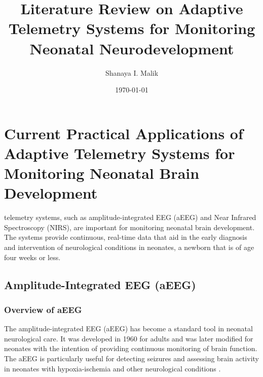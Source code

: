 \documentclass[12pt,journal,compsoc]{IEEEtran}
\begin{document}
\title{Literature Review on Adaptive Telemetry Systems for Monitoring Neonatal Neurodevelopment}
\author{Shanaya I. Malik}

\date{\today}

%


\maketitle

\section{Current Practical Applications of Adaptive Telemetry Systems for Monitoring Neonatal Brain Development}

 telemetry systems, such as amplitude-integrated EEG (aEEG) and Near Infrared Spectroscopy (NIRS), are important for monitoring neonatal brain development. The systems provide continuous, real-time data that aid in the early diagnosis and intervention of neurological conditions in neonates, a newborn that is of age four weeks or less. 

\subsection{Amplitude-Integrated EEG (aEEG)}

\subsubsection{Overview of aEEG}
The amplitude-integrated EEG (aEEG) has become a standard tool in neonatal neurological care. It was developed in 1960 for adults and was later modified for neonates with the intention of providing continuous monitoring of brain function. The aEEG is particularly useful for detecting seizures and assessing brain activity in neonates with hypoxia-ischemia and other neurological conditions \cite{IEEEhowto:toet}.
\end{document}
